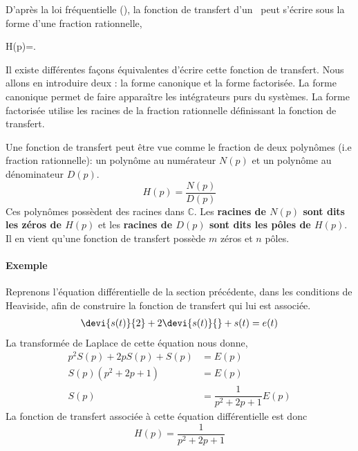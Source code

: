 D'après la loi fréquentielle (), la fonction de transfert 
d'un \SLCI~peut s'écrire sous la forme d'une fraction rationnelle,
\begin{bequation}
H(p)=. \label{eq-ftgen}
\end{bequation}

Il existe différentes façons équivalentes d'écrire cette fonction de transfert. 
Nous allons en introduire deux :
la forme canonique et la forme factorisée. La forme canonique permet de faire apparaître 
les intégrateurs purs du systèmes. La forme factorisée utilise les racines de la 
fraction rationnelle définissant la fonction de transfert. 

Une fonction de transfert peut être vue comme le fraction de deux polynômes (i.e fraction rationnelle):
un polynôme au numérateur $N(p)$ et un polynôme au dénominateur $D(p)$.
$$
H(p)=\dfrac{N(p)}{D(p)}
$$
Ces polynômes possèdent des racines dans $\mathbb{C}$. Les \textbf{racines de $N(p)$ sont 
dits les zéros de $H(p)$ }et les \textbf{racines de $D(p)$ 
sont dits les pôles de $H(p)$}. Il en vient qu'une fonction de transfert possède $m$ zéros et $n$ pôles.

\paragraph{Exemple}
Reprenons l'équation différentielle de la section précédente, dans les conditions de Heaviside, afin de construire 
la fonction de transfert qui lui est associée. 
\begin{align}                                                                                                                 
\devi{s(t)}{2}+2\devi{s(t)}{} + s(t) = e(t)  
\end{align}  
La transformée de Laplace de cette équation nous donne,
\begin{align*}                                        
	p^2S(p)+2pS(p)+S(p)&=E(p)\\
	S(p)\left(p^2+2p+1\right)&=E(p)\\
	S(p)&=\dfrac{1}{p^2+2p+1}E(p)
\end{align*}  
La fonction de transfert associée à cette équation différentielle est donc 
$$
H(p)=\dfrac{1}{p^2+2p+1}
$$


